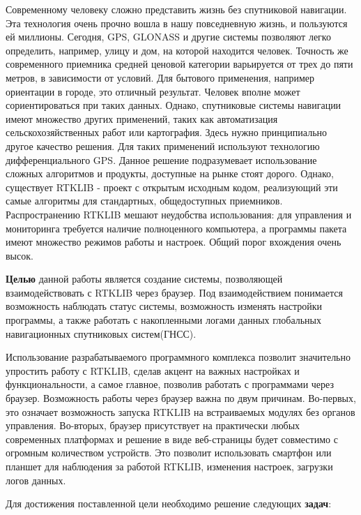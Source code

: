\intro

Современному человеку сложно представить жизнь без спутниковой навигации. Эта технология очень прочно вошла в нашу повседневную жизнь, и пользуются ей миллионы. Сегодня, GPS, GLONASS и другие системы позволяют легко определить, например, улицу и дом, на которой находится человек. Точность же современного приемника средней ценовой категории варьируется от трех до пяти метров, в зависимости от условий. Для бытового применения, например ориентации в городе, это отличный результат. Человек вполне может сориентироваться при таких данных. Однако, спутниковые системы навигации имеют множество других применений, таких как автоматизация сельскохозяйственных работ или картография. Здесь нужно принципиально другое качество решения. Для таких применений используют технологию дифференциального GPS. Данное решение подразумевает использование сложных алгоритмов и продукты, доступные на рынке стоят дорого. Однако, существует RTKLIB - проект с открытым исходным кодом, реализующий эти самые алгоритмы для стандартных, общедоступных приемников. Распространению RTKLIB мешают неудобства использования: для управления и мониторинга требуется наличие полноценного компьютера, а программы пакета имеют множество режимов работы и настроек. Общий порог вхождения очень высок.

\textbf{Целью} данной работы является создание системы, позволяющей взаимодействовать с RTKLIB через браузер. Под взаимодействием понимается возможность наблюдать статус системы, возможность изменять настройки программы, а также работать с накопленными логами данных глобальных навигационных спутниковых систем(ГНСС).

Использование разрабатываемого программного комплекса позволит значительно упростить работу с RTKLIB, сделав акцент на важных настройках и функциональности, а самое главное, позволив работать с программами через браузер. Возможность работы через браузер важна по двум причинам. Во-первых, это означает возможность запуска RTKLIB на встраиваемых модулях без органов управления. Во-вторых, браузер присутствует на практически любых современных платформах и решение в виде веб-страницы будет совместимо с огромным количеством устройств. Это позволит использовать смартфон или планшет для наблюдения за работой RTKLIB, изменения настроек, загрузки логов данных.

Для достижения поставленной цели необходимо решение следующих \textbf{задач}:

